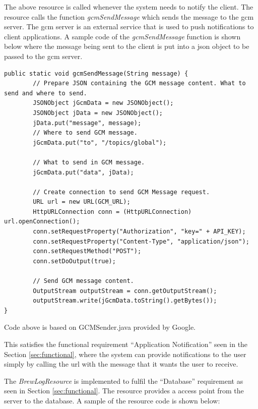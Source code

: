 \documentclass{article}
\begin{document}
\noindent The above resource is called whenever the system needs to notify the client. The resource calls the function \textit{gcmSendMessage} which sends the message to the \gls{gcm} server. The \gls{gcm} server is an external service that is used to push notifications to client applications. A sample code of the \textit{gcmSendMessage} function is shown below where the message being sent to the client is put into a \gls{json} object to be passed to the \gls{gcm} server. 

\begin{lstlisting}
public static void gcmSendMessage(String message) {
        // Prepare JSON containing the GCM message content. What to send and where to send.
        JSONObject jGcmData = new JSONObject();
        JSONObject jData = new JSONObject();
        jData.put("message", message);
        // Where to send GCM message.
        jGcmData.put("to", "/topics/global");
       
        // What to send in GCM message.
        jGcmData.put("data", jData);

        // Create connection to send GCM Message request.
        URL url = new URL(GCM_URL);
        HttpURLConnection conn = (HttpURLConnection) url.openConnection();
        conn.setRequestProperty("Authorization", "key=" + API_KEY);
        conn.setRequestProperty("Content-Type", "application/json");
        conn.setRequestMethod("POST");
        conn.setDoOutput(true);

        // Send GCM message content.
        OutputStream outputStream = conn.getOutputStream();
        outputStream.write(jGcmData.toString().getBytes());
}
\end{lstlisting}
\cite{gcm-sendnotification} Code above is based on GCMSender.java provided by Google.

\noindent This satisfies the functional requirement ``Application Notification'' seen in the  Section \ref{sec:functional}, where the system can provide notifications to the user simply by calling the \gls{url} with the message that it wants the user to receive.

\noindent The \textit{BrewLogResource}  is implemented to fulfil the ``Database'' requirement as seen in  Section \ref{sec:functional}. The resource provides a access point from the server to the database. A sample of the resource code is shown below:
 
\end{document}
